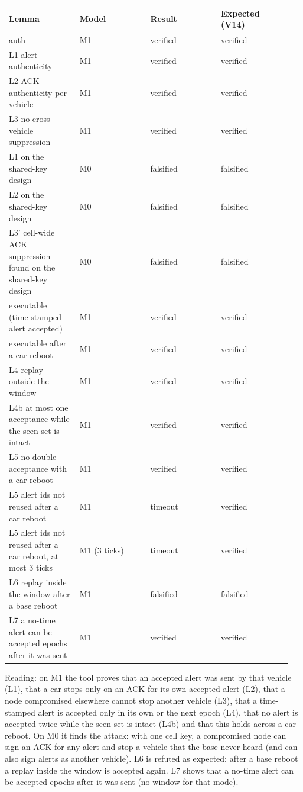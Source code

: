 {\scriptsize\raggedright
\begin{longtable}{p{0.237\linewidth}p{0.237\linewidth}p{0.237\linewidth}p{0.237\linewidth}}
\toprule
Lemma & Model & Result & Expected (V14) \\
\midrule
\endhead
auth & M1 & verified & verified \\
L1 alert authenticity & M1 & verified & verified \\
L2 ACK authenticity per vehicle & M1 & verified & verified \\
L3 no cross-vehicle suppression & M1 & verified & verified \\
L1 on the shared-key design & M0 & falsified & falsified \\
L2 on the shared-key design & M0 & falsified & falsified \\
L3' cell-wide ACK suppression found on the shared-key design & M0 & falsified & falsified \\
executable (time-stamped alert accepted) & M1 & verified & verified \\
executable after a car reboot & M1 & verified & verified \\
L4 replay outside the window & M1 & verified & verified \\
L4b at most one acceptance while the seen-set is intact & M1 & verified & verified \\
L5 no double acceptance with a car reboot & M1 & verified & verified \\
L5 alert ids not reused after a car reboot & M1 & timeout & verified \\
L5 alert ids not reused after a car reboot, at most 3 ticks & M1 (3 ticks) & timeout & verified \\
L6 replay inside the window after a base reboot & M1 & falsified & falsified \\
L7 a no-time alert can be accepted epochs after it was sent & M1 & verified & verified \\
\bottomrule
\end{longtable}}

Reading: on M1 the tool proves that an accepted alert was sent by that vehicle (L1), that a car stops only on an ACK for its own accepted alert (L2), that a node compromised elsewhere cannot stop another vehicle (L3), that a time-stamped alert is accepted only in its own or the next epoch (L4), that no alert is accepted twice while the seen-set is intact (L4b) and that this holds across a car reboot. On M0 it finds the attack: with one cell key, a compromised node can sign an ACK for any alert and stop a vehicle that the base never heard (and can also sign alerts as another vehicle). L6 is refuted as expected: after a base reboot a replay inside the window is accepted again. L7 shows that a no-time alert can be accepted epochs after it was sent (no window for that mode).

